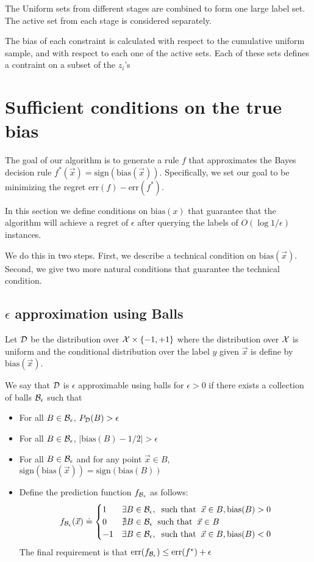 \documentclass{article}
\newcommand{\err}{\mbox{err}}
\newcommand{\X}{{\cal X}}
\newcommand{\D}{{\cal D}}
\newcommand{\x}{\vec{x}}
\newcommand{\bias}{\text{bias}}
\newcommand{\sign}{\text{sign}}
\begin{document}
The Uniform sets from different stages are combined to form one
large label set. The active set from each stage is considered
separately.

The bias of each constraint is calculated with respect to the
cumulative uniform sample, and with respect to each one of the active
sets. Each of these sets defines a contraint on a subset of the $z_i$'s 

\section{Sufficient conditions on the true bias}
\newcommand{\Bayes}{f^*}
The goal of our algorithm is to generate a rule $f$ that
approximates the Bayes decision rule $\Bayes(\x) = \sign(\bias(\x))$.
Specifically, we set our goal to be minimizing the regret $\err(f) - \err(\Bayes)$.

In this section we define conditions on $\bias(x)$ that guarantee that
the algorithm will achieve a regret of $\epsilon$ after querying the
labels of $O(\log 1/\epsilon)$ instances.

We do this in two steps. First, we describe a technical condition on
$\bias(\x)$. Second, we give two more natural conditions that
guarantee the technical condition.

\subsection{$\epsilon$ approximation using Balls}

Let $\D$ be the distribution over $\X\times \{-1,+1\}$ where the
distribution over $\X$ is uniform and the conditional distribution
over the label $y$ given $\x$ is define by $\bias(\x)$.

\newcommand{\Be}{{\cal B}_{\epsilon}}
\newcommand{\fBe}{f_{\Be}}
\newcommand{\UBe}{U_{\epsilon}}
We say that $\D$ is $\epsilon$ approximable using balls for $\epsilon>0$ if
there exists a collection of balls $\Be$ such that 
\begin{itemize}
\item For all $B \in \Be$, $P_{\D}(B)>\epsilon$
\item For all $B \in \Be$, $|\bias(B)-1/2| > \epsilon$
\item For all $B \in \Be$ and for any point $\x \in B$, $\sign(\bias(\x))=\sign(\bias(B))$
\item %
  Define the prediction function $\fBe$ as follows:
  \[
  \fBe(\x) \doteq \begin{cases}
    1 & \exists B \in \Be, \;\;\mbox{such that}\;\; \x \in B,
    \bias(B)>0 \\
    0 & \nexists B \in \Be \;\;\mbox{such that}\;\; \x \in B \\
    -1 & \exists B \in \Be, \;\;\mbox{such that}\;\; \x \in B,
    \bias(B)<0
  \end{cases}
  \]
  The final requirement is that $\err(\fBe) \leq \err(\Bayes)+\epsilon$
\end{itemize}
\end{document}
